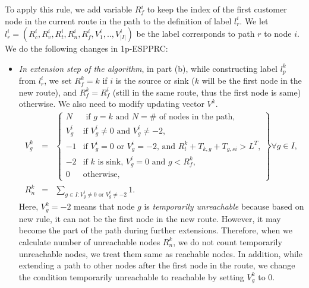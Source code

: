 To apply this rule, we add variable $R^i_{f}$ to keep the index of the 
first customer node in the current route in the path to the definition of
label $l_r^i$. We let  
$l_r^i = (R^i_c, R^i_{v},R^i_{t}, R^i_n, R^i_{f}, V^i_1,..,V^i_{|I|})$
be the label corresponds to path $r$ to node $i$.
We do the following changes in 1p-ESPPRC:
\begin{itemize}
\item {\em In extension step of the algorithm}, in part (b), while constructing 
  label $l^k_p$ from $l^i_r$, we set $R^k_{f} = k$ if $i$ is the source or 
  sink ($k$ will be the first node in the new route), and $R^k_{f} = R^i_{f}$ (still
  in the same route, thus the first node is same) 
  otherwise. We also need to modify updating 
  vector $V^k$. 
 \begin{eqnarray*}
   V^k_g & = & \left\{ \begin{array}{llll}
             N & \mbox{ if $g = k$ and $N = \#$ of nodes in the path,}  \\
         V^i_g & \mbox{if  $V^i_g \neq 0$ and $V^i_g \neq -2$,}\\
	    -1 & \mbox{if  $V^i_g = 0$ or $V^i_g = -2$, and $R^k_{t} + T_{k,g} + T_{g,si} > L^T$,}  \\
            -2 & \mbox{if  $k$ is sink, $V^i_g = 0$ and $g < R^k_{f}$,}  \\
             0 & \mbox{otherwise,}
      \end{array} 
      \right\} \forall g \in I, \\
     R^k_n    & = &  \sum_{g \in I: V^i_g \neq 0 \mbox{ or }V^i_g \neq -2} 1. 
    \end{eqnarray*}
 Here, $V^k_g = -2$ means that node $g$ is  {\em temporarily unreachable} 
 because based on new rule, it can not be the first node in the new route.
 However, it may become the part of the
 path during further extensions. Therefore, when we calculate number
 of unreachable nodes  $R^k_n$, we do not count temporarily unreachable
 nodes, we treat them same as reachable nodes. In addition, while extending
 a path to other nodes after the first node in the route, we change the condition
 temporarily unreachable to reachable by setting $V^k_g$ to 0. 
 

\end{itemize}
